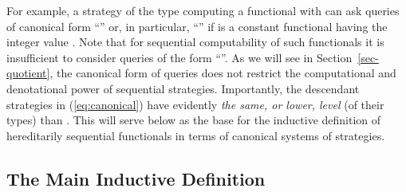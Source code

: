 \documentclass[fleqn]{LMCS}
\theoremstyle{plain}\newtheorem{satz}[thm]{Satz}
\theoremstyle{plain}\newtheorem{hyp}[thm]{Hypothesis}
\theoremstyle{plain}\newtheorem{hyps}[thm]{Hypotheses}
\theoremstyle{definition}\newtheorem{note}[thm]{Note}
\newcommand{\?}{\mbox{?}}
\begin{document}
\noindent
For example, a strategy  of the type  
computing a functional  with  
can ask queries of canonical form 
``'' or, in particular, ``'' 
if  is a constant functional having the integer value . 
Note that for sequential computability of such functionals 
it is insufficient to consider queries of the form ``''. 
As we will see in Section~\ref{sec-quotient}, 
the canonical form of queries does not restrict the 
computational and denotational power of sequential strategies. 
Importantly, the descendant strategies  in (\ref{eq:canonical}) 
have evidently \emph{the same, or lower, level} 
(of their types) than .
This will serve below as the base for the inductive definition of 
hereditarily sequential functionals in terms of canonical systems 
of strategies. 

\subsection{The Main Inductive Definition}
\label{sec:ind-def}
\end{document}

